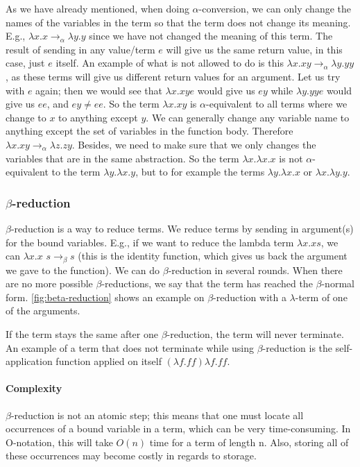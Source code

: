 \para
As we have already mentioned, when doing $\alpha$-conversion, we can only change the names of the variables in the term so that the term does not change its meaning. 
E.g., $\lambda x.x \rightarrow_\alpha \lambda y.y$ since we have not changed the meaning of this term. The result of sending in any value/term $e$ will give us the same return value, in this case, just $e$ itself. An example of what is not allowed to do is this $\lambda x.xy \rightarrow_\alpha \lambda y.yy$, as these terms will give us different return values for an argument. Let us try with $e$ again; then we would see that  $\lambda x.xy e$ would give us $ey$ while $\lambda y.yy e$ would give us $ee$, and $ey \neq ee$. So the term $\lambda x.xy$ is $\alpha$-equivalent to all terms where we change to $x$ to anything except $y$. We can generally change any variable name to anything except the set of variables in the function body. Therefore $\lambda x.xy \rightarrow_\alpha \lambda z.zy$. Besides, we need to make sure that we only changes the variables that are in the same abstraction. So the term $\lambda x.\lambda x.x $ is not $\alpha$-equivalent to the 
term $\lambda y.\lambda x.y$, but to for example the terms $\lambda y.\lambda x.x$ or $\lambda x.\lambda y.y$.

\subsubsection{$\beta$-reduction}
$\beta$-reduction is a way to reduce terms. We reduce terms by sending in argument(s) for the bound variables. E.g., if we want to reduce the lambda term $\lambda x. x s$, 
we can $\lambda x. x$  $s \rightarrow _\beta s$ (this is the identity function, which gives us back the argument we gave to the function). We can do $\beta$-reduction in several rounds. When there are no more possible $\beta$-reductions, we say that the term has reached the $\beta$-normal form. \autoref{fig:beta-reduction} shows an example on $\beta$-reduction with a $\lambda$-term of one of the arguments. 

\para
If the term stays the same after one $\beta$-reduction, the term will never terminate. An example of a term that does not terminate while using $\beta$-reduction is the self-application function applied on itself $(\lambda f.ff) \lambda f.ff$.

\paragraph{Complexity}
$\beta$-reduction is not an atomic step; this means that one must locate all occurrences of a bound variable in a term, which can be very time-consuming. In O-notation, this will take $O(n)$ time for a term of length n. Also, storing all of these occurrences may become costly in regards to storage. 

